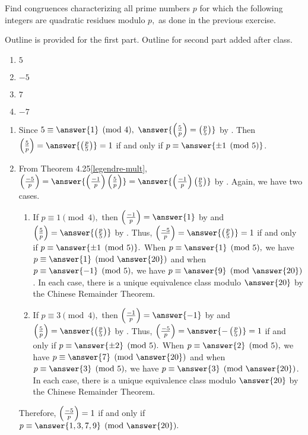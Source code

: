 \documentclass{../ximera}
\begin{document}
\begin{br}
	Find congruences characterizing all prime numbers $p$ for which the following integers are quadratic residues modulo $p,$ as done in the previous exercise. 
	
	Outline is provided for the first part. Outline for second part added after class.
	\begin{enumerate}[label=(\alph*)]
		\item $5$ 
		\item $-5$	
		\item $7$ 
		\item $-7$	
	\end{enumerate}
\end{br}

\begin{solution}
 	\begin{enumerate}[label=(\alph*)]
		\item Since $5\equiv\answer{1}\pmod{4},$ $\answer{\legendre{5}{p}=\legendre{p}{5}}$ by . Then $\legendre{5}{p}=\answer{\legendre{p}{5}}=1$ if and only if $p\equiv\answer{ \pm1\pmod{5}}$.

		\item From Theorem 4.25\ref{legendre-mult}, $\legendre{-5}{p}= \answer{\legendre{-1}{p}\legendre{5}{p}}=\answer{\legendre{-1}{p}\legendre{p}{5}}$ by . Again, we have two cases.
			
			\begin{enumerate}[label=(\roman*)]
 				\item If $p\equiv 1\pmod{4},$ then $\legendre{-1}{p}=\answer{1}$ by  and
				$\legendre{5}{p}=\answer{\legendre{p}{5}}$ by . Thus, $\legendre{-5}{p}=\answer{\legendre{p}{5}}=1$ if and only if $p\equiv \answer{\pm1\pmod{5}}.$ When $p\equiv \answer{1}\pmod{5},$ we have $p\equiv\answer{1}\pmod{\answer{20}}$ and when $p\equiv \answer{-1}\pmod{5},$ we have $p\equiv\answer{9}\pmod{\answer{20}}$. In each case, there is a unique equivalence class modulo $\answer{20}$ by the Chinese Remainder Theorem.
		
		\item If $p\equiv 3\pmod{4},$ then $\legendre{-1}{p}=\answer{-1}$ by  and
				$\legendre{5}{p}=\answer{\legendre{p}{5}}$ by . Thus, $\legendre{-5}{p}=\answer{-\legendre{p}{5}}=1$ if and only if $p\equiv \answer{\pm 2}\pmod{5}.$ When $p\equiv \answer{2}\pmod{5},$ we have $p\equiv\answer{7}\pmod{\answer{20}}$ and when $p\equiv \answer{3}\pmod{5},$ we have $p\equiv\answer{3}\pmod{\answer{20}}$. In each case, there is a unique equivalence class modulo $\answer{20}$ by the Chinese Remainder Theorem.
	\end{enumerate}
	Therefore, $\left(\frac{-5}{p}\right)=1$ if and only if $p\equiv \answer{1,3,7,9}\pmod{\answer{20}}.$\qedhere
	\end{enumerate}
\end{solution}
\end{document}
